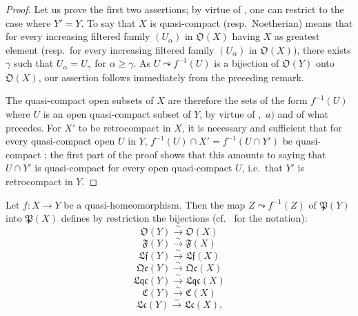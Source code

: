 \begin{proof}
Let us prove the first two assertions; by virtue of , one can restrict to the case where $Y'=Y$.
To say that $X$ is quasi-compact (resp.\ Noetherian) means that for every increasing filtered family $(U_\alpha)$ in $\mathfrak{O}(X)$ having $X$ as greatest element (resp.\ for every increasing filtered family $(U_\alpha)$ in $\mathfrak{O}(X)$), there exists $\gamma$ such that $U_\alpha=U_\gamma$ for $\alpha\geq\gamma$.
As $U\leadsto f^{-1}(U)$ is a bijection of $\mathfrak{O}(Y)$ onto $\mathfrak{O}(X)$, our assertion follows immediately from the preceding remark.

The quasi-compact open subsets of $X$ are therefore the sets of the form $f^{-1}(U)$ where $U$ is an open quasi-compact subset of $Y$, by virtue of ,~$a)$ and of what precedes.
For $X'$ to be retrocompact in $X$, it is necessary and sufficient that for every quasi-compact open $U$ in $Y$, $f^{-1}(U)\cap X'=f^{-1}(U\cap Y')$ be quasi-compact ; the first part of the proof shows that this amounts to saying that $U\cap Y'$ is quasi-compact for every open quasi-compact $U$, i.e.\ that $Y'$ is retrocompact in $Y$.
\end{proof}

\begin{proposition}[10.2.7]
\label{IV.10.2.7}
Let $f:X\to Y$ be a quasi-homeomorphism.
Then the map $Z\leadsto f^{-1}(Z)$ of $\mathfrak{P}(Y)$ into $\mathfrak{P}(X)$ defines by restriction the bijections \textup{(cf.\  for the notation)}:
\[
  \mathfrak{O}(Y)\xrightarrow{\sim}\mathfrak{O}(X)
\]
\[
  \mathfrak{F}(Y)\xrightarrow{\sim}\mathfrak{F}(X)
\]
\[
  \mathfrak{Lf}(Y)\xrightarrow{\sim}\mathfrak{Lf}(X)
\]
\[
  \mathfrak{Qc}(Y)\xrightarrow{\sim}\mathfrak{Qc}(X)
\]
\[
  \mathfrak{Lqc}(Y)\xrightarrow{\sim}\mathfrak{Lqc}(X)
\]
\[
  \mathfrak{C}(Y)\xrightarrow{\sim}\mathfrak{C}(X)
\]
\[
  \mathfrak{Lc}(Y)\xrightarrow{\sim}\mathfrak{Lc}(X).
\]
\end{proposition}

